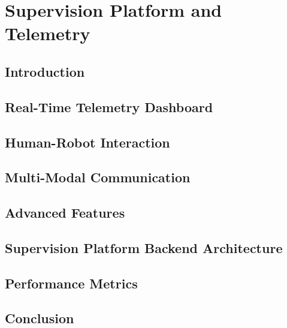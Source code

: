 \chapter{Supervision Platform and Telemetry}

\section{Introduction}

\section{Real-Time Telemetry Dashboard }

\section{Human-Robot Interaction}

\section{Multi-Modal Communication }

\section{Advanced Features}

\section{Supervision Platform Backend Architecture}

\section{Performance Metrics}

\section{Conclusion}
